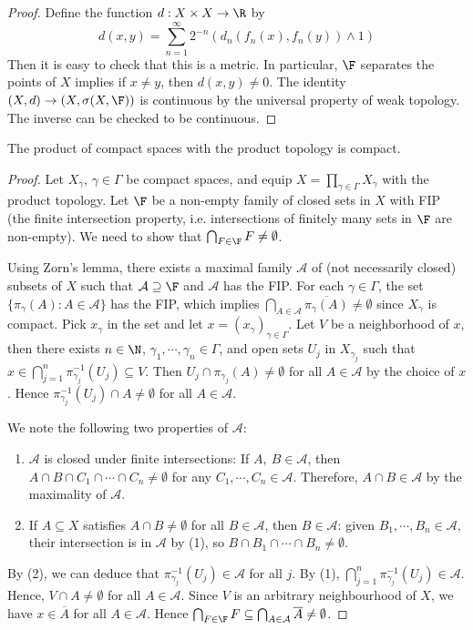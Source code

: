 \documentclass[a4paper]{article}
\begin{document}
\begin{proof}
  Define the function $d:X\times X\to\R$ by
  \[
    d(x,y)=\sum_{n=1}^\infty 2^{-n}(d_n(f_n(x),f_n(y))\land 1)
  \]
  Then it is easy to check that this is a metric. In particular, $\F$ separates the points of $X$ implies if $x\not= y$, then $d(x,y)\not= 0$. The identity $(X,d)\to(X,\sigma(X,\F))$ is continuous by the universal property of weak topology. The inverse can be checked to be continuous.
\end{proof}

\begin{nthm}\label{thm:Tychonoff}
  The product of compact spaces with the product topology is compact.
\end{nthm}

\begin{proof}
	Let $X_\gamma$, $\gamma\in\Gamma$ be compact spaces, and equip $X=\prod_{\gamma\in\Gamma}X_\gamma$ with the product topology. Let $\F$ be a non-empty family of closed sets in $X$ with FIP (the finite intersection property, i.e. intersections of finitely many sets in $\F$ are non-empty). We need to show that $\bigcap_{F\in\F}F\not=\emptyset$.

	Using Zorn's lemma, there exists a maximal family $\mathcal{A}$ of (not necessarily closed) subsets of $X$ such that $\mathcal{A}\supseteq\F$ and $\mathcal{A}$ has the FIP. For each $\gamma\in\Gamma$, the set $\{\pi_\gamma(A):A\in\mathcal{A}\}$ has the FIP, which implies $\bigcap_{A\in\mathcal{A}}\overline{\pi_\gamma(A)}\not=\emptyset$ since $X_\gamma$ is compact. Pick $x_\gamma$ in the set and let $x=(x_\gamma)_{\gamma\in\Gamma}$. Let $V$ be a neighborhood of $x$, then there exists $n\in\N$, $\gamma_1,\cdots,\gamma_n\in\Gamma$, and open sets $U_j$ in $X_{\gamma_j}$ such that $x\in\bigcap_{j=1}^n\pi^{-1}_{\gamma_j}(U_j)\subseteq V$. Then $U_j\cap\pi_{\gamma_j}(A)\not=\emptyset$ for all $A\in\mathcal{A}$ by the choice of $x$. Hence $\pi_{\gamma_j}^{-1}(U_j)\cap A\not=\emptyset$ for all $A\in\mathcal{A}$.

	We note the following two properties of $\mathcal{A}$:
	\begin{enumerate}
		\item $\mathcal{A}$ is closed under finite intersections: If $A,\ B\in\mathcal{A}$, then $A\cap B\cap C_1\cap\cdots\cap C_n\not=\emptyset$ for any $C_1,\cdots,C_n\in\mathcal{A}$. Therefore, $A\cap B\in\mathcal{A}$ by the maximality of $\mathcal{A}$.
		\item If $A\subseteq X$ satisfies $A\cap B\not=\emptyset$ for all $B\in\mathcal{A}$, then $B\in\mathcal{A}$: given $B_1,\cdots,B_n\in\mathcal{A}$, their intersection is in $\mathcal{A}$ by (1), so $B\cap B_1\cap\cdots\cap B_n\not=\emptyset$.
	\end{enumerate}
	By (2), we can deduce that $\pi^{-1}_{\gamma_j}(U_j)\in\mathcal{A}$ for all $j$. By (1), $\bigcap_{j=1}^n\pi^{-1}_{\gamma_j}(U_j)\in\mathcal{A}$. Hence, $V\cap A\not=\emptyset$ for all $A\in\mathcal{A}$. Since $V$ is an arbitrary neighbourhood of $X$, we have $x\in\overline{A}$ for all $A\in\mathcal{A}$. Hence $\bigcap_{F\in\F}F\subseteq\bigcap_{A\in\mathcal{A}}\overline{A} \not=\emptyset$.
\end{proof}
\end{document}
